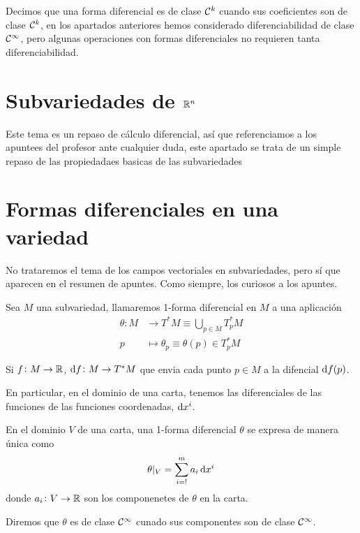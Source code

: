 \begin{defi}
    Decimos que una forma diferencial es de clase $\mathcal{C}^k$ cuando sus coeficientes son de clase $\mathcal{C}^k$, en los apartados anteriores hemos
    considerado diferenciabilidad de clase $\mathcal{C}^\infty$, pero algunas operaciones con formas diferenciales no requieren tanta diferenciabilidad.
\end{defi}

\section{Subvariedades de $\mathbb{R}^n$}

Este tema es un repaso de cálculo diferencial, así que referenciamos a los apuntees del profesor
ante cualquier duda, este apartado se trata de un simple repaso de las propiedadaes basicas de las
subvariedades

\section{Formas diferenciales en una variedad}

\begin{obs*}
    No trataremos el tema de los campos vectoriales en subvariedades, pero sí que aparecen en el resumen de apuntes. Como siempre, los curiosos
    a los apuntes.
\end{obs*}

\setcounter{lema}{4}

\begin{defi}
    Sea $M$ una subvariedad, llamaremos 1-forma diferencial en $M$ a una aplicación
    \[
        \begin{aligned}
            \theta \colon M &\to T^\ast M \equiv \bigcup_{p \in M} T^\ast_pM \\
            p &\mapsto \theta_p \equiv \theta(p) \in T^\ast_p M
        \end{aligned}
    \]
\end{defi}

\begin{obs}
    Si $f \colon M \to \mathbb{R}$, $\dif f \colon M \to T^\ast M$ que envia cada punto $p \in M$ a la difencial $\dif f(p)$.

    En particular, en el dominio de una carta, tenemos las diferenciales de las funciones de las funciones coordenadas, $\dif x^i$.
\end{obs}

\begin{defi}
    En el dominio $V$ de una carta, una 1-forma diferencial $\theta$ se expresa de manera única como
    \[
        \theta \vert_V = \sum^m_{i=!} a_i \dif x^i
    \]
    donde $a_i \colon V \to \mathbb{R}$ son los componenetes de $\theta$ en la carta.

    Diremos que $\theta$ es de clase $\mathcal{C}^\infty$ cunado sus componentes son de clase $\mathcal{C}^\infty$.
\end{defi}

